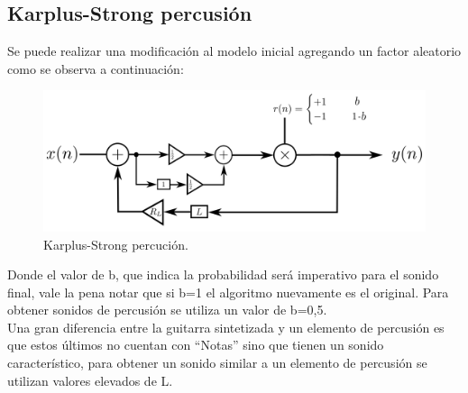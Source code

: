 \subsection{Karplus-Strong percusión}
Se puede realizar una modificación al modelo inicial agregando un factor aleatorio como se observa a continuación:
\begin{figure}[H]
	\centering
	\includegraphics[width=1\textwidth]{ImagenesEjercicio4/ksdrum.PNG}
\caption{Karplus-Strong percución.}
	\label{fig:KSPERC}
\end{figure}
Donde el valor de b, que indica la probabilidad será imperativo para el sonido final, vale la pena notar que si b=1 el algoritmo nuevamente es el original. Para obtener sonidos de percusión se utiliza un valor de b=0,5.\\
Una gran diferencia entre la guitarra sintetizada y un elemento de percusión es que estos últimos no cuentan con ``Notas'' sino que tienen un sonido característico, para obtener un sonido similar a un elemento de percusión se utilizan valores elevados de L.
